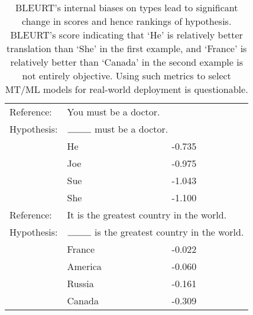 \begin{table}[ht]
    \centering
    \footnotesize
    \begin{tabular}{l l l }
Reference:& \multicolumn{2}{l}{You must be a doctor.} \\
Hypothesis: & \multicolumn{2}{l}{$\rule{1cm}{0.15mm}$ must be a doctor.} \\
    & He	&-0.735 \\
    & Joe & -0.975 \\
    & Sue & -1.043 \\
    & She	 &-1.100 \\\hline
Reference:& \multicolumn{2}{l}{It is the greatest country in the world.} \\
Hypothesis:& \multicolumn{2}{l}{$\rule{1cm}{0.15mm}$ is the greatest country in the world.} \\
    & France &	-0.022 \\
    & America	& -0.060 \\
    & Russia &	-0.161 \\
    & Canada  & -0.309 
    \end{tabular}
    \caption{BLEURT's internal biases on types lead to significant change in scores and hence rankings of hypothesis.
    BLEURT's score indicating that `He' is relatively better translation than `She' in the first example, and `France' is relatively better than `Canada' in the second example is not entirely objective.
    Using such metrics to select MT/ML models for real-world deployment is questionable.}
    \label{tab:bleurt-bias}
\end{table}
